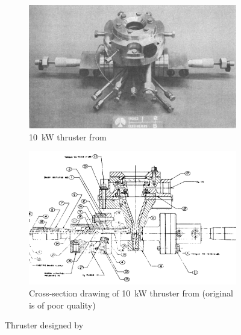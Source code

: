         \begin{figure}[!ht]
            \centering
            \begin{subfigure}[t]{0.45\textwidth}
                \centering
                \includegraphics[width=\textwidth]{assets/2 background/Shoji_assy.png}
                \caption{\qty{10}{kW} thruster from \textcite{shojiPerformanceHeatTransfer1976a}}
                \label{fig:Shoji apparatus}
                \end{subfigure}
            \hfill
            \begin{subfigure}[t]{0.45\textwidth}
                \centering
                \includegraphics[width=\textwidth]{assets/2 background/Shoji cross-section.png}
                \caption{Cross-section drawing of \qty{10}{kW} thruster from \textcite{shojiLaserheatedRocketThruster1977} (original is of poor quality)}
                \label{fig:Shoji cross-section}
            \end{subfigure}
            \caption{Thruster designed by \textcite{shojiLaserheatedRocketThruster1977}}
            \label{fig:Shoji apparatussies}
        \end{figure}


